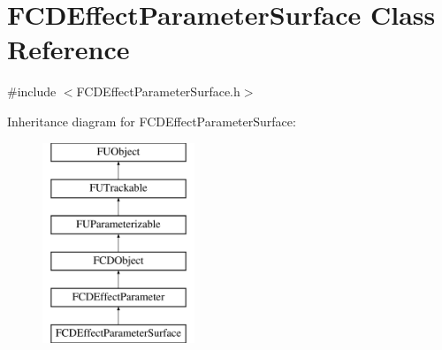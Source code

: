 \hypertarget{classFCDEffectParameterSurface}{
\section{FCDEffectParameterSurface Class Reference}
\label{classFCDEffectParameterSurface}
}


{\ttfamily \#include $<$FCDEffectParameterSurface.h$>$}

Inheritance diagram for FCDEffectParameterSurface:\begin{figure}[H]
\begin{center}
\leavevmode
\includegraphics[height=6.000000cm]{classFCDEffectParameterSurface}
\end{center}
\end{figure}
